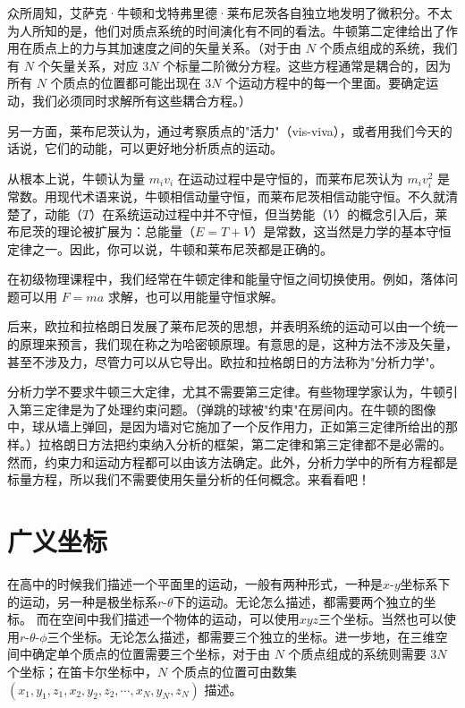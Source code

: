 众所周知，艾萨克·牛顿和戈特弗里德·莱布尼茨各自独立地发明了微积分。不太为人所知的是，他们对质点系统的时间演化有不同的看法。牛顿第二定律给出了作用在质点上的力与其加速度之间的矢量关系。（对于由 $N$ 个质点组成的系统，我们有 $N$ 个矢量关系，对应 $3N$ 个标量二阶微分方程。这些方程通常是耦合的，因为所有 $N$ 个质点的位置都可能出现在 $3N$ 个运动方程中的每一个里面。要确定运动，我们必须同时求解所有这些耦合方程。）

另一方面，莱布尼茨认为，通过考察质点的"活力"（vis-viva），或者用我们今天的话说，它们的动能，可以更好地分析质点的运动。

从根本上说，牛顿认为量 $m_iv_i$ 在运动过程中是守恒的，而莱布尼茨认为 $m_iv_i^2$ 是常数。用现代术语来说，牛顿相信动量守恒，而莱布尼茨相信动能守恒。不久就清楚了，动能（$T$）在系统运动过程中并不守恒，但当势能（$V$）的概念引入后，莱布尼茨的理论被扩展为：总能量（$E = T + V$）是常数，这当然是力学的基本守恒定律之一。因此，你可以说，牛顿和莱布尼茨都是正确的。

在初级物理课程中，我们经常在牛顿定律和能量守恒之间切换使用。例如，落体问题可以用 $F = ma$ 求解，也可以用能量守恒求解。

后来，欧拉和拉格朗日发展了莱布尼茨的思想，并表明系统的运动可以由一个统一的原理来预言，我们现在称之为哈密顿原理。有意思的是，这种方法不涉及矢量，甚至不涉及力，尽管力可以从它导出。欧拉和拉格朗日的方法称为"分析力学"。

分析力学不要求牛顿三大定律，尤其不需要第三定律。有些物理学家认为，牛顿引入第三定律是为了处理约束问题。（弹跳的球被"约束"在房间内。在牛顿的图像中，球从墙上弹回，是因为墙对它施加了一个反作用力，正如第三定律所给出的那样。）拉格朗日方法把约束纳入分析的框架，第二定律和第三定律都不是必需的。然而，约束力和运动方程都可以由该方法确定。此外，分析力学中的所有方程都是标量方程，所以我们不需要使用矢量分析的任何概念。来看看吧！
\section{广义坐标}
在高中的时候我们描述一个平面里的运动，一般有两种形式，一种是$x$-$y$坐标系下的运动，另一种是极坐标系$r$-$\theta$下的运动。无论怎么描述，都需要两个独立的坐标。
而在空间中我们描述一个物体的运动，可以使用$x$$y$$z$三个坐标。当然也可以使用$r$-$\theta$-$\phi$三个坐标。无论怎么描述，都需要三个独立的坐标。进一步地，在三维空间中确定单个质点的位置需要三个坐标，对于由 $N$ 个质点组成的系统则需要 $3N$ 个坐标；在笛卡尔坐标中，$N$ 个质点的位置可由数集 $(x_1, y_1, z_1, x_2, y_2, z_2, \cdots, x_N, y_N, z_N)$ 描述。

